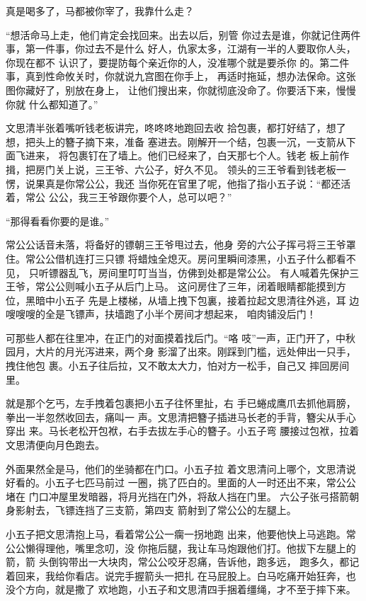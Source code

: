 真是喝多了，马都被你宰了，我靠什么走？

“想活命马上走，他们肯定会找回来。出去以后，别管
你过去是谁，你就记住两件事，第一件事，你过去不是什么
好人，仇家太多，江湖有一半的人要取你人头，你现在都不
认识了，要提防每个亲近你的人，没准哪个就是要杀你
的。第二件事，真到性命攸关时，你就说九宫图在你手上，
再适时拖延，想办法保命。这张图你藏好了，别放在身上，
让他们搜出来，你就彻底没命了。你要活下来，慢慢你就
什么都知道了。”

文思清半张着嘴听钱老板讲完，咚咚咚地跑回去收
拾包裹，都打好结了，想了想，把头上的簪子摘下来，准备
塞进去。刚解开一个结，包裹一沉，一支箭从下面飞进来，
将包裹钉在了墙上。他们已经来了，白天那七个人。钱老
板上前作揖，把房门关上说，三王爷、六公子，好久不见。
领头的三王爷看到钱老板一愣，说果真是你常公公，我还
当你死在官里了呢，他指了指小五子说：“都还活着，常公
公公，我三王爷跟你要个人，总可以吧？”

“那得看看你要的是谁。”

常公公话音未落，将备好的镖朝三王爷甩过去，他身
旁的六公子挥弓将三王爷罩住。常公公借机连打三只镖
将蜡烛全熄灭。房问里瞬间漆黑，小五子什么都看不见，
只听镖器乱飞，房间里叮叮当当，仿佛到处都是常公公。
有人喊着先保护三王爷，常公公则喊小五子从后门上马。
这问房住了三年，闭着眼睛都能摸到方位，黑暗中小五子
先是上楼梯，从墙上拽下包裏，接着拉起文思清往外逃，耳
边嗖嗖嗖的全是飞镖声，扶墙跑了小半个房间才想起来，
咱肉铺没后门！

可那些人都在往里冲，在正门的对面摸着找后门。“咯
吱”一声，正门开了，中秋园月，大片的月光泻进来，两个身
影溜了出來。刚踩到门槛，远处伸出一只手，拽住他包
裹。小五子往后拉，又不敢太大力，怕对方一松手，自己又
摔回房间里。

就是那个乞丐，左手拽着包裹把小五子往怀里扯，右
手已蜷成鹰爪去抓他肩膀，拳出一半忽然收回去，痛叫一
声。文思清把簪子插进马长老的手背，簪尖从手心穿出
来。马长老松开包袱，右手去拔左手心的簪子。小五子弯
腰接过包袱，拉着文思清便向月色跑去。

外面果然全是马，他们的坐骑都在门口。小五子拉
着文思清问上哪个，文思清说好看的。小五子七匹马前过
一圈，挑了匹白的。里面的人一时还出不来，常公公堵在
门口冲屋里发暗器，将月光挡在门外，将敌人挡在门里。
六公子张弓搭箭朝身影射去，飞镖连挡了三支箭，第四支
箭射到了常公公的左腿上。

小五子把文思清抱上马，看着常公公一瘸一拐地跑
出来，他要他快上马逃跑。常公公懒得理他，嘴里念叨，没
你拖后腿，我让车马炮跟他们打。他拔下左腿上的箭，箭
头倒钩带出一大块肉，常公公咬牙忍痛，告诉他，跑多远，
跑多久，都记着回来，我给你看店。说完手握箭头一把扎
在马屁股上。白马吃痛开始狂奔，也没个方向，就是撒了
欢地跑，小五子和文思清四手捆着缰绳，才不至于摔下来。
\newline

